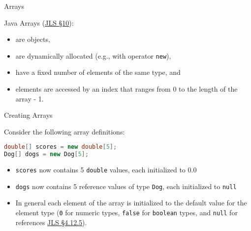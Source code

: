 \documentclass{beamer}
\author[Chris Simpkins] 
{Christopher Simpkins \\\texttt{chris.simpkins@gatech.edu}}
\institute[Georgia Tech] %
\date[CS 1331]{}
\begin{document}
\begin{frame}
  \titlepage
\end{frame}




\begin{frame}[fragile]{Arrays}


Java Arrays (\href{http://docs.oracle.com/javase/specs/jls/se7/html/jls-10.html}{JLS \S 10}):
\begin{itemize}
\item are objects,
\item are dynamically allocated (e.g., with operator {\tt new}),
\item have a fixed number of elements of the same type, and
\item elements are accessed by an index that ranges from 0 to the length of the array - 1.
\end{itemize}



\end{frame}

\begin{frame}[fragile]{Creating Arrays}


Consider the following array definitions:
\begin{lstlisting}[language=Java]
double[] scores = new double[5];
Dog[] dogs = new Dog[5];
\end{lstlisting}

\begin{itemize}
\item {\tt scores} now contains 5 {\tt double} values, each initialized to 0.0
\item {\tt dogs} now contains 5 reference values of type {\tt Dog}, each initialized to {\tt null}
\item In general each element of the array is initialized to the default value for the element type ({\tt 0} for numeric types, {\tt false} for {\tt boolean} types, and {\tt null} for references \href{http://docs.oracle.com/javase/specs/jls/se7/html/jls-4.html#jls-4.12.5}{JLS \S 4.12.5}).

\end{itemize}

\end{frame}
\end{document}
